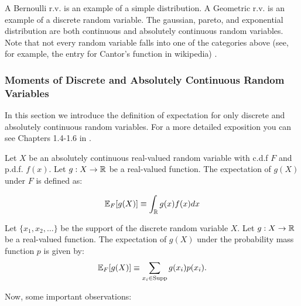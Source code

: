 \documentclass[11pt]{article} %
\begin{document}
A Bernoulli r.v. is an example of a simple distribution. A Geometric r.v. is an example of a discrete random variable. The gaussian, pareto, and exponential distribution are both continuous and absolutely continuous random variables. Note that not every random variable falls into one of the categories above (see, for example, the entry for Cantor's function in wikipedia) .

\subsubsection{Moments of Discrete and Absolutely Continuous Random Variables}
In this section we introduce the definition of expectation for only discrete and absolutely continuous random variables. For a more detailed exposition you can see Chapters 1.4-1.6 in \cite{durrett2010}.

\begin{definition} Let $X$ be an absolutely continuous real-valued random variable with c.d.f $F$ and p.d.f. $f(x)$. Let $g:X \rightarrow \mathbb{R}$ be a real-valued function. The expectation of $g(X)$ under $F$ is defined as:

$$\mathbb{E}_{F}[g(X)] \equiv \int_{\mathbb{R}} g(x)f(x)dx  $$



\end{definition}
 
 \begin{definition} Let $\{x_1, x_2, \ldots\}$ be the support of the discrete random variable $X$. Let $g:X \rightarrow \mathbb{R}$ be a real-valued function. The expectation of $g(X)$ under the probability mass function $p$ is given by:
 $$\mathbb{E}_{F}[g(X)] \equiv \sum_{x_i \in \text{Supp}} g(x_i) p(x_i).   $$
 \noindent  
 \end{definition}
 
 \noindent Now, some important observations:
 
\end{document}
